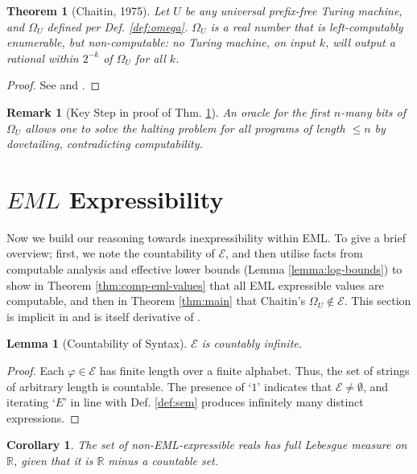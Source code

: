 \documentclass[a4paper,10pt]{article}
\newtheorem{lemma}{Lemma}
\newtheorem{theorem}{Theorem}
\newtheorem{corollary}{Corollary}
\newtheorem*{remark}{Remark}
\begin{document}
\begin{theorem}[Chaitin, 1975]\label{thm:omega-non-comp}
    Let $U$ be any universal prefix-free Turing machine, and $\Omega_U$ defined per Def. \ref{def:omega}. $\Omega_U$ is a real number that is left-computably enumerable, but non-computable: no Turing machine, on input $k$, will output a rational within $2^{-k}$ of $\Omega_U$ for all $k$.
\end{theorem}

\begin{proof}
    See \cite{Chaitin1975} and \cite[Thm. 3.6.9]{Downey2010-wc}.
\end{proof}

\begin{remark}[Key Step in proof of Thm. \ref{thm:omega-non-comp}]
    An oracle for the first $n$-many bits of $\Omega_U$ allows one to solve the halting problem for all programs of length $\leq n$ by dovetailing, contradicting computability.
\end{remark}

\section{$EML$ Expressibility}\label{sec:expressibility}

Now we build our reasoning towards inexpressibility within EML. To give a brief overview; first, we note the countability of $\mathcal{E}$, and then utilise facts from computable analysis \cite{Weihrauch2000} and effective lower bounds (Lemma \ref{lemma:log-bounds}) to show in Theorem \ref{thm:comp-eml-values} that all EML expressible values are computable, and then in Theorem \ref{thm:main} that Chaitin's $\Omega_U \notin \mathcal{E}$. This section is implicit in \cite{Chow1999} and is itself derivative of \cite[\S9]{TZ2009}.

\begin{lemma}[Countability of Syntax]\label{lemma:comp-syntax}
    $\mathcal{E}$ is countably infinite.
\end{lemma}

\begin{proof}
    Each $\varphi \in \mathcal{E}$ has finite length over a finite alphabet. Thus, the set of strings of arbitrary length is countable. The presence of `$1$' indicates that $\mathcal{E} \neq \emptyset$, and iterating `$E$' in line with Def. \ref{def:sem} produces infinitely many distinct expressions. 
\end{proof}

\begin{corollary}
    The set of non-EML-expressible reals has full Lebesgue measure on $\mathbb{R}$, given that it is $\mathbb{R}$ minus a countable set. 
\end{corollary}
\end{document}
